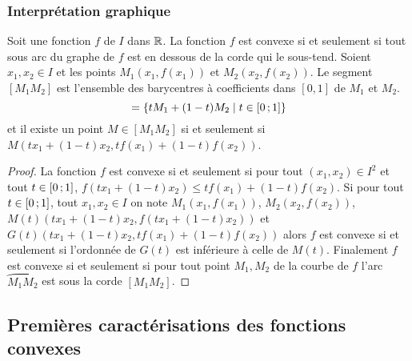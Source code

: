 \subsubsection{Interprétation graphique}

Soit une fonction \(f\) de \(I\) dans \(\mathbb{R}\). La fonction \(f\) est convexe si
et seulement si tout sous arc du graphe de \(f\) est en dessous de la corde qui
le sous-tend. Soient \(x_1, x_2 \in I\) et les points \(M_1(x_1,f(x_1))\) et
\(M_2(x_2,f(x_2))\). Le segment \([M_1M_2]\) est l'ensemble des barycentres à
coefficients dans \([0,1]\) de \(M_1\) et \(M_2\).
\begin{equation}
  [M_1M_2]=\enstq{tM_1 +(1-t)M_2}{t \in \intervalleff{0}{1}}
\end{equation}
et il existe un point \(M \in [M_1M_2]\) si et seulement si \(M(tx_1+(1-t)x_2,
tf(x_1)+(1-t)f(x_2))\).

\begin{proof}
  La fonction \(f\) est convexe si et seulement si pour tout \((x_1,x_2) \in
  I^2\) et tout \(t \in \left[ 0 \, ; {} 1 \right]\), \(f(tx_1+(1-t)x_2) \leqslant
  tf(x_1)+(1-t)f(x_2)\). Si pour tout \(t \in \left[ 0 \, ; {} 1 \right]\), tout
  \(x_1,x_2 \in I\) on note \(M_1(x_1,f(x_1))\), \(M_2(x_2,f(x_2))\),
  \(M(t)(tx_1+(1-t)x_2,f(tx_1+(1-t)x_2))\) et
  \(G(t)(tx_1+(1-t)x_2,tf(x_1)+(1-t)f(x_2))\) alors \(f\) est convexe si et
  seulement si l'ordonnée de \(G(t)\) est inférieure à celle de \(M(t)\).
  Finalement \(f\) est convexe si et seulement si pour tout point \(M_1, M_2\)
  de la courbe de \(f\) l'arc \(\wideparen{M_1M_2}\) est sous la corde
  \([M_1M_2]\).
\end{proof}

\subsection{Premières caractérisations des fonctions convexes}

